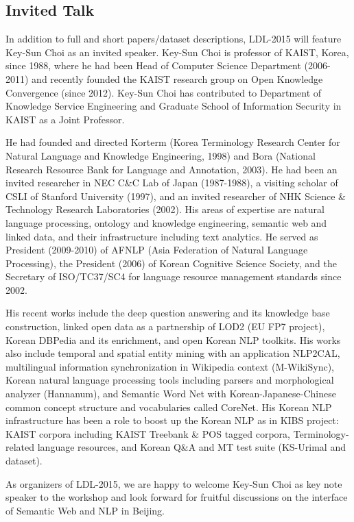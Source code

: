 \subsection{Invited Talk}

In addition to full and short papers/dataset descriptions, LDL-2015 will feature Key-Sun Choi as an invited speaker. Key-Sun Choi is professor of KAIST, Korea, since 1988, where he had been Head of Computer Science Department (2006-2011) and recently founded the KAIST research group on Open Knowledge Convergence (since 2012). Key-Sun Choi has contributed to Department of Knowledge Service Engineering and Graduate School of Information Security in KAIST as a Joint Professor.

He had founded and directed Korterm (Korea Terminology Research Center for Natural Language and Knowledge Engineering, 1998) and Bora (National Research Resource Bank for Language and Annotation, 2003). He had been an invited researcher in NEC C\&C Lab of Japan (1987-1988), a visiting scholar of CSLI of Stanford University (1997), and an invited researcher of NHK Science \& Technology Research Laboratories (2002). His areas of expertise are natural language processing, ontology and knowledge engineering, semantic web and linked data, and their infrastructure including text analytics. He served as President (2009-2010) of AFNLP (Asia Federation of Natural Language Processing), the President (2006) of Korean Cognitive Science Society, and the Secretary of ISO/TC37/SC4 for language resource management standards since 2002. 

His recent works include the deep question answering and its knowledge base construction, linked open data as a partnership of LOD2 (EU FP7 project), Korean DBPedia and its enrichment, and open Korean NLP toolkits. His works also include temporal and spatial entity mining with an application NLP2CAL, multilingual information synchronization in Wikipedia context (M-WikiSync), Korean natural language processing tools including parsers and morphological analyzer (Hannanum), and Semantic Word Net with Korean-Japanese-Chinese common concept structure and vocabularies called CoreNet.  His Korean NLP infrastructure has been a role to boost up the Korean NLP as in KIBS project: KAIST corpora including KAIST Treebank \& POS tagged corpora, Terminology-related language resources, and Korean Q\&A and MT test suite (KS-Urimal and dataset). 

As organizers of LDL-2015, we are happy to welcome Key-Sun Choi as key note speaker to the workshop and look forward for fruitful discussions on the interface of Semantic Web and NLP in Beijing.

